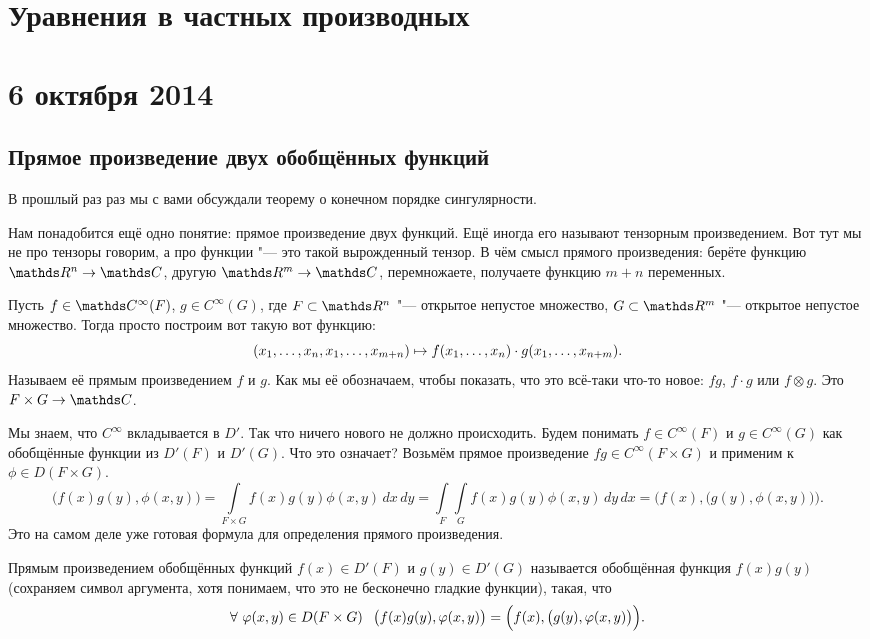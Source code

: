\section*{Уравнения в частных производных}
\section{6 октября 2014}
\subsection{Прямое произведение двух обобщённых функций}
В прошлый раз раз мы с вами обсуждали теорему о конечном порядке сингулярности.

Нам понадобится ещё одно понятие: прямое произведение двух функций. Ещё иногда его называют тензорным произведением. Вот тут мы не про тензоры говорим, а про функции "--- это такой вырожденный тензор. В чём смысл прямого произведения: берёте функцию $\R^n\to \C$, другую $\R^m\to \C$, перемножаете, получаете функцию $m+n$ переменных.

Пусть $f\in\C^\infty(F)$, $g\in C^\infty(G)$, где $F\subset \R^n$ "--- открытое непустое множество, $G\subset \R^m$ "--- открытое непустое множество. Тогда просто построим вот такую вот функцию:
\[(\ve xn,\ve[n+1]x{m+n})\mapsto f(\ve xn)\cdot g(\ve[n+1]x{n+m}).\]
Называем её прямым произведением $f$ и $g$. Как мы её обозначаем, чтобы показать, что это всё-таки что-то новое: $fg$, $f\cdot g$ или $f\otimes g$. Это $ F\times G \to \C$.

Мы знаем, что $C^{\infty}$ вкладывается в $D'$. Так что ничего нового не должно происходить. Будем понимать $f\in C^\infty (F)$ и $g\in C^\infty (G)$ как обобщённые функции из $D'(F)$ и $D'(G)$. Что это означает? Возьмём прямое произведение $fg\in C^\infty(F\times G)$ и применим к $\phi\in D(F\times G)$.
\[
  \big(f(x)g(y),\phi(x,y)\big) = \int\limits_{F\times G} f(x)g(y) \phi(x,y) \,dx\,dy = \int\limits_F\int\limits_G f(x)g(y) \phi(x,y) \,dy\,dx = \Big(f(x),\big(g(y),\phi(x,y)\big)\Big).
\]
Это на самом деле уже готовая формула для определения прямого произведения.

\begin{Def}\label{DefOtimes}
  Прямым произведением обобщённых функций $f(x)\in D'(F)$ и $g(y)\in D'(G)$ называется обобщённая функция $f(x)g(y)$ (сохраняем символ аргумента, хотя понимаем, что это не бесконечно гладкие функции), такая, что
\[
 \forall\ \phi(x,y)\in D(F\times G)\pau \big(f(x)g(y),\phi(x,y)\big) = \Big(f(x),\big(g(y),\phi(x,y)\big)\Big).
\]
\end{Def}

